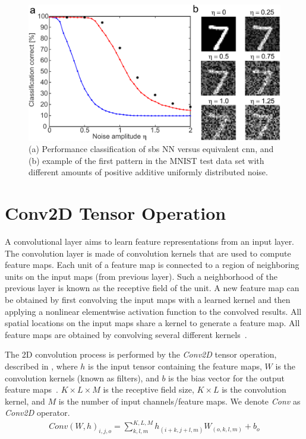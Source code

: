 \begin{figure}[b!]
	\centering
	\includegraphics[width=0.5\columnwidth]{./chapters/sbs_accelerator/figures/sbs_robustnes.pdf}
	\caption{(a) Performance classification of \gls{sbs} NN versus equivalent \gls{cnn}, and (b) example of the first pattern in the MNIST test data set with different amounts of positive additive uniformly distributed noise.}
	\label{fig:robustnes_sbs}
\end{figure}

\section{Conv2D Tensor Operation}
A convolutional layer aims to learn feature representations from an input layer. The convolution layer is made of convolution kernels that are used to compute feature maps. Each unit of a feature map is connected to a region of neighboring units on the input maps (from previous layer). Such a neighborhood of the previous layer is known as the receptive field of the unit. A new feature map can be obtained by first convolving the input maps with a learned kernel and then applying a nonlinear elementwise activation function to the convolved results. All spatial locations on the input maps share a kernel to generate a feature map. All feature maps are obtained by convolving several different kernels~\cite{gu2018recent}.


The 2D convolution process is performed by the \emph{Conv2D} tensor operation, described in , where $h$ is the input tensor containing the feature maps, $W$ is the convolution kernels (known as filters), and $b$ is the bias vector for the output feature maps~\cite{goodfellow2016deep}. $K\times L\times M$ is the receptive field size, $K\times L$ is the convolution kernel, and $M$ is the number of input channels/feature maps. We denote \emph{Conv} as \emph{Conv2D} operator.
\begin{eqnarray} \label{eq:conv2D}
Conv\left(W,h\right)_{i,j,o}=\sum_{k,l,m}^{K,L,M} h_{(i+k,j+l,m)} W_{(o,k,l,m)}+b_{o}
\end{eqnarray}

